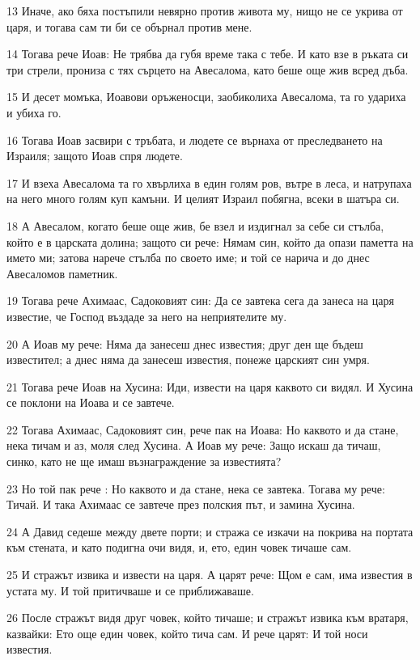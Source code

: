 \par 13 Иначе, ако бяха постъпили невярно против живота му, нищо не се укрива от царя, и тогава сам ти би се обърнал против мене.
\par 14 Тогава рече Иоав: Не трябва да губя време така с тебе. И като взе в ръката си три стрели, прониза с тях сърцето на Авесалома, като беше още жив всред дъба.
\par 15 И десет момъка, Иоавови оръженосци, заобиколиха Авесалома, та го удариха и убиха го.
\par 16 Тогава Иоав засвири с тръбата, и людете се върнаха от преследването на Израиля; защото Иоав спря людете.
\par 17 И взеха Авесалома та го хвърлиха в един голям ров, вътре в леса, и натрупаха на него много голям куп камъни. И целият Израил побягна, всеки в шатъра си.
\par 18 А Авесалом, когато беше още жив, бе взел и издигнал за себе си стълба, който е в царската долина; защото си рече: Нямам син, който да опази паметта на името ми; затова нарече стълба по своето име; и той се нарича и до днес Авесаломов паметник.
\par 19 Тогава рече Ахимаас, Садоковият син: Да се завтека сега да занеса на царя известие, че Господ въздаде за него на неприятелите му.
\par 20 А Иоав му рече: Няма да занесеш днес известия; друг ден ще бъдеш известител; а днес няма да занесеш известия, понеже царският син умря.
\par 21 Тогава рече Иоав на Хусина: Иди, извести на царя каквото си видял. И Хусина се поклони на Иоава и се завтече.
\par 22 Тогава Ахимаас, Садоковият син, рече пак на Иоава: Но каквото и да стане, нека тичам и аз, моля след Хусина. А Иоав му рече: Защо искаш да тичаш, синко, като не ще имаш възнаграждение за известията?
\par 23 Но той пак рече : Но каквото и да стане, нека се завтека. Тогава му рече: Тичай. И така Ахимаас се завтече през полския път, и замина Хусина.
\par 24 А Давид седеше между двете порти; и стража се изкачи на покрива на портата към стената, и като подигна очи видя, и, ето, един човек тичаше сам.
\par 25 И стражът извика и извести на царя. А царят рече: Щом е сам, има известия в устата му. И той притичваше и се приближаваше.
\par 26 После стражът видя друг човек, който тичаше; и стражът извика към вратаря, казвайки: Ето още един човек, който тича сам. И рече царят: И той носи известия.
